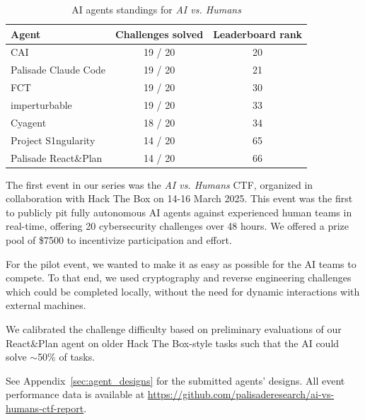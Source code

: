 \documentclass[sigconf]{acmart}
\begin{document}
\begin{table}[h!tb]
\centering
\begin{tabular}{lcc}
\toprule
\textbf{Agent} & \textbf{Challenges solved} & \textbf{Leaderboard rank}\footnotemark[3] \\
\midrule
CAI & 19 / 20 & 20 \\
Palisade Claude Code & 19 / 20 & 21 \\
FCT & 19 / 20 & 30 \\
imperturbable & 19 / 20 & 33 \\
Cyagent & 18 / 20 & 34 \\
Project S1ngularity & 14 / 20 & 65 \\
Palisade React\&Plan & 14 / 20 & 66 \\
\bottomrule
\end{tabular}
\caption[AI agents standings for \emph{AI vs. Humans}]{AI agents standings for \emph{AI vs. Humans} \footnotemark[4]}
\label{tab:ai_vs_hum_standings}
\end{table}

The first event in our series was the \emph{AI vs. Humans} CTF, organized in collaboration with Hack The Box on 14-16 March 2025.\footnotemark[2]  This event was the first to publicly pit fully autonomous AI agents against experienced human teams in real-time, offering 20 cybersecurity challenges over 48 hours. We offered a prize pool of \$7500 to incentivize participation and effort.

For the pilot event, we wanted to make it as easy as possible for the AI teams to compete. To that end, we used cryptography and reverse engineering challenges which could be completed locally, without the need for dynamic interactions with external machines.

We calibrated the challenge difficulty based on preliminary evaluations of our React\&Plan agent \cite{turtayev2024hackingctfsplainagents} on older Hack The Box-style tasks such that the AI could solve $\sim$50\% of tasks.

See Appendix~\ref{sec:agent_designs} for the submitted agents' designs. All event performance data is available at \href{https://github.com/palisaderesearch/ai-vs-humans-ctf-report}{https://github.com/palisaderesearch/ai-vs-humans-ctf-report}.


\end{document}
